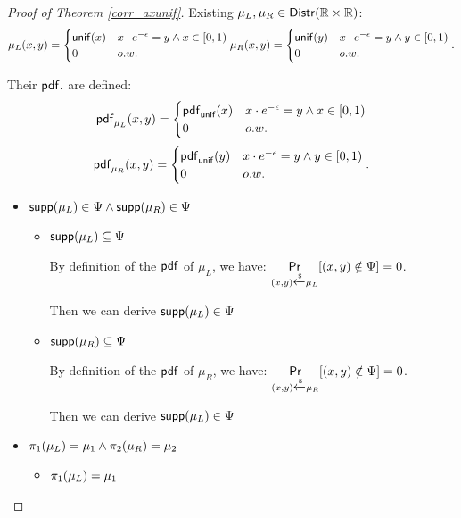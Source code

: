 \documentclass[a4paper,11pt]{article}
\begin{document}
\begin{proof}[Proof of Theorem \ref{corr_axunif}]

Existing $\mu_L, \mu_R \in \mathsf{Distr}(\mathbb{R} \times \mathbb{R})$:
\[
	{\mu_L}(x, y) = 
	\begin{cases}
	{\mathsf{unif}}(x) & x \cdot e^{-\epsilon} = y \land x \in [0, 1)\\
	0       & o.w.
	\end{cases}
	\\
	{\mu_R}(x, y) = 
	\begin{cases}
	{\mathsf{unif}}(y) & x \cdot e^{-\epsilon} = y \land y \in [0, 1)\\
	0       & o.w.
	\end{cases}.
\]


Their $\mathsf{pdf}.$ are defined:
\[
	\mathsf{pdf}_{\mu_L}(x, y) = 
	\begin{cases}
	\mathsf{pdf}_{\mathsf{unif}}(x) & x \cdot e^{-\epsilon} = y \land x \in [0, 1)\\
	0       & o.w.
	\end{cases}
\]
\[
	\mathsf{pdf}_{\mu_R}(x, y) = 
	\begin{cases}
	\mathsf{pdf}_{\mathsf{unif}}(y) & x \cdot e^{-\epsilon} = y \land y \in [0, 1)\\
	0       & o.w.
	\end{cases}.
\]
\begin{itemize}
	\item $\mathsf{supp}(\mu_L) \in \Psi \land \mathsf{supp}(\mu_R) \in \Psi$

	\begin{itemize}
		\item $\mathsf{supp}(\mu_L) \subseteq \Psi$ 

		By definition of the $\mathsf{pdf}$ of $\mu_L$, we have: $\underset{(x,y) \xleftarrow{\$} \mu_L}{\mathsf{Pr}}[(x,y) \notin \Psi] = 0$.

		Then we can derive $\mathsf{supp}(\mu_L) \in \Psi$

		\item $\mathsf{supp}(\mu_R) \subseteq \Psi$

		By definition of the $\mathsf{pdf}$ of $\mu_R$, we have: $\underset{(x,y) \xleftarrow{\$} \mu_R}{\mathsf{Pr}}[(x,y) \notin \Psi] = 0$.

		Then we can derive $\mathsf{supp}(\mu_L) \in \Psi$

	\end{itemize}		


	\item $\pi_1(\mu_L) = \mu_1 \land \pi_2(\mu_R) = \mu_2$
	
	\begin{itemize}
		\item $\pi_1(\mu_L) = \mu_1$ 


\end{itemize}
\end{itemize}
\end{proof}
\end{document}
